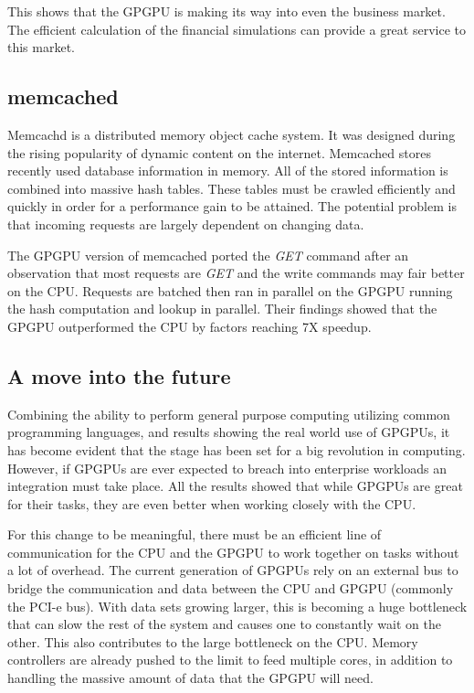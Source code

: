 This shows that the GPGPU is making its way into even the business market. The efficient calculation of the financial simulations can provide a great service to this market. \cite{finance}

\subsection*{memcached}


Memcachd is a distributed memory object cache system. It was designed during the rising popularity of dynamic content on the internet. Memcached stores recently used database information in memory. All of the stored information is combined into massive hash tables. These tables must be crawled efficiently and quickly in order for a performance gain to be attained. The potential problem is that incoming requests are largely dependent on changing data. 

The GPGPU version of memcached ported the \textit{GET} command after an observation that most requests are \textit{GET} and the write commands may fair better on the CPU. Requests are batched then ran in parallel on the GPGPU running the hash computation and lookup in parallel. Their findings showed that the GPGPU outperformed the CPU by factors reaching 7X speedup. \cite{memcached}


\subsection*{A move into the future}

Combining the ability to perform general purpose computing utilizing common programming languages, and results showing the real world use of GPGPUs, it has become evident that the stage has been set for a big revolution in computing. However, if GPGPUs are ever expected to breach into enterprise workloads an integration must take place. All the results showed that while GPGPUs are great for their tasks, they are even better when working closely with the CPU. 

For this change to be meaningful, there must be an efficient line of communication for the CPU and the GPGPU to work together on tasks without a lot of overhead. The current generation of GPGPUs rely on an external bus to bridge the communication and data between the CPU and GPGPU (commonly the PCI-e bus). With data sets growing larger, this is becoming a huge bottleneck that can slow the rest of the system and causes one to constantly wait on the other. This also contributes to the large bottleneck on the CPU. Memory controllers are already pushed to the limit to feed multiple cores, in addition to handling the massive amount of data that the GPGPU will need.

